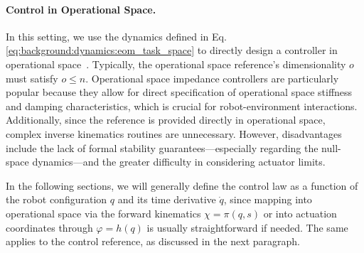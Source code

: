 \paragraph{Control in Operational Space.}
In this setting, we use the dynamics defined in Eq.\ref{eq:background:dynamics:eom_task_space} to directly design a controller in operational space~\citep{khatib1987unified}. Typically, the operational space reference’s dimensionality $o$ must satisfy $o \leq n$. Operational space impedance controllers are particularly popular because they allow for direct specification of operational space stiffness and damping characteristics, which is crucial for robot-environment interactions. Additionally, since the reference is provided directly in operational space, complex inverse kinematics routines are unnecessary. However, disadvantages include the lack of formal stability guarantees—especially regarding the null-space dynamics—and the greater difficulty in considering actuator limits.

In the following sections, we will generally define the control law as a function of the robot configuration $q$ and its time derivative $\dot{q}$, since mapping into operational space via the forward kinematics $\chi = \pi(q,s)$ or into actuation coordinates through $\varphi = h(q)$ is usually straightforward if needed. The same applies to the control reference, as discussed in the next paragraph.

